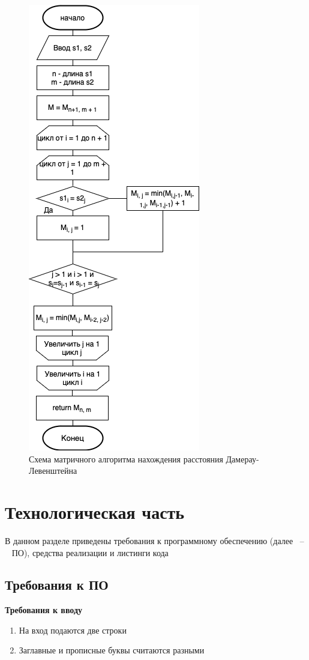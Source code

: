 \documentclass[12pt]{report}
\begin{document}
\begin{figure}[h]
	\centering
	\includegraphics[width=0.5\linewidth]{dam_lev_iter.png}
	\caption{Схема матричного алгоритма нахождения расстояния Дамерау-Левенштейна}
	\label{fig:iter_dam_lev}
\end{figure}

\chapter{Технологическая часть}

В данном разделе приведены требования к программному обеспечению (далее ~--~ ПО), средства реализации и листинги кода

\section{Требования к ПО}

\textbf{Требования к вводу}
		
\begin{enumerate}
	\item На вход подаются две строки
	\item Заглавные и прописные буквы считаются разными
\end{enumerate}
		
\end{document}
